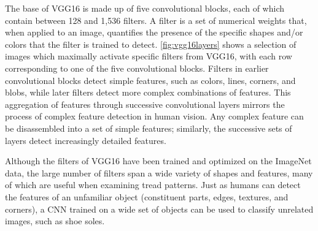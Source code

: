 \documentclass{article}\usepackage[]{graphicx}\usepackage[table]{xcolor}
\begin{document}
The base of VGG16 is made up of five convolutional blocks, each of which contain between 128 and 1,536 filters. A filter is a set of numerical weights that, when applied to an image, quantifies the presence of the specific shapes and/or colors that the filter is trained to detect. \autoref{fig:vgg16layers} shows a selection of images which maximally activate specific filters from VGG16, with each row corresponding to one of the five convolutional blocks. Filters in earlier convolutional blocks detect simple features, such as colors, lines, corners, and blobs, while later filters detect more complex combinations of features. This aggregation of features through successive convolutional layers mirrors the process of complex feature detection in human vision. Any complex feature can be disassembled into a set of simple features; similarly, the successive sets of layers detect increasingly detailed features.

Although the filters of VGG16 have been trained and optimized on the ImageNet data, the large number of filters span a wide variety of shapes and features, many of which are useful when examining tread patterns. Just as humans can detect the features of an unfamiliar object (constituent parts, edges, textures, and corners), a CNN trained on a wide set of objects can be used to classify unrelated images, such as shoe soles.
\end{document}
